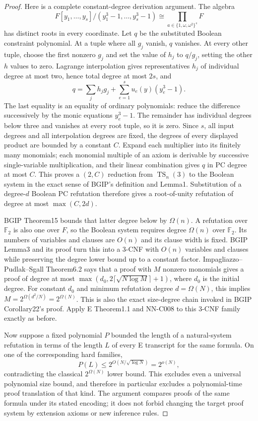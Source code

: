 \begin{proof}
Here is a complete constant-degree derivation argument. The algebra
\[
 F[y_1,\ldots,y_s]/(y_1^3-1,\ldots,y_s^3-1)
 \cong\prod_{a\in\{1,\omega,\omega^2\}^{s}}F
\]
has distinct roots in every coordinate. Let $q$ be the substituted Boolean constraint polynomial. At a tuple where all $g_j$ vanish, $q$ vanishes. At every other tuple, choose the first nonzero $g_j$ and set the value of $h_j$ to $q/g_j$, setting the other $h$ values to zero. Lagrange interpolation gives representatives $h_j$ of individual degree at most two, hence total degree at most $2s$, and
\[
 q=\sum_j h_jg_j+\sum_{e=1}^{s}u_e(y)(y_e^3-1).
\]
The last equality is an equality of ordinary polynomials: reduce the difference successively by the monic equations $y_e^3-1$. The remainder has individual degrees below three and vanishes at every root tuple, so it is zero. Since $s$, all input degrees and all interpolation degrees are fixed, the degrees of every displayed product are bounded by a constant $C$. Expand each multiplier into its finitely many monomials; each monomial multiple of an axiom is derivable by successive single-variable multiplication, and their linear combination gives $q$ in PC degree at most $C$. This proves a $(2,C)$ reduction from $\operatorname{TS}_n(3)$ to the Boolean system in the exact sense of BGIP's definition and Lemma1. Substitution of a degree-$d$ Boolean PC refutation therefore gives a root-of-unity refutation of degree at most $\max(C,2d)$.

BGIP Theorem15 bounds that latter degree below by $\Omega(n)$. A refutation over $\mathbb F_2$ is also one over $F$, so the Boolean system requires degree $\Omega(n)$ over $\mathbb F_2$. Its numbers of variables and clauses are $O(n)$ and its clause width is fixed. BGIP Lemma3 and its proof turn this into a 3-CNF with $O(n)$ variables and clauses while preserving the degree lower bound up to a constant factor. Impagliazzo--Pudlak--Sgall Theorem6.2 says that a proof with $M$ nonzero monomials gives a proof of degree at most $\max(d_0,2\lceil\sqrt{N\log M}\rceil+1)$, where $d_0$ is the initial degree. For constant $d_0$ and minimum refutation degree $d=\Omega(N)$, this implies $M=2^{\Omega(d^2/N)}=2^{\Omega(N)}$. This is also the exact size-degree chain invoked in BGIP Corollary22's proof. Apply E Theorem1.1 and NN-C008 to this 3-CNF family exactly as before.

Now suppose a fixed polynomial $P$ bounded the length of a natural-system refutation in terms of the length $L$ of every E transcript for the same formula. On one of the corresponding hard families,
\[
 P(L)\leq2^{O(N/\sqrt{\log N})}=2^{o(N)},
\]
contradicting the classical $2^{\Omega(N)}$ lower bound. This excludes even a universal polynomial size bound, and therefore in particular excludes a polynomial-time proof translation of that kind. The argument compares proofs of the same formula under its stated encoding; it does not forbid changing the target proof system by extension axioms or new inference rules.


\end{proof}
